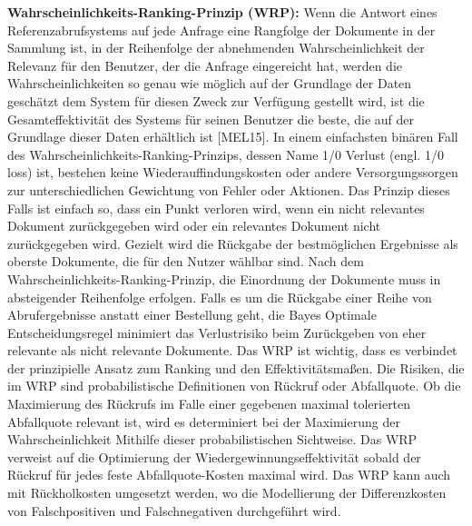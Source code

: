 \begin{itemize}
\textbf{Wahrscheinlichkeits-Ranking-Prinzip (WRP):} Wenn die Antwort eines Referenzabrufsystems auf jede Anfrage eine Rangfolge der Dokumente in der Sammlung ist, in der Reihenfolge der abnehmenden Wahrscheinlichkeit der Relevanz für den Benutzer, der die Anfrage eingereicht hat, werden die Wahrscheinlichkeiten so genau wie möglich auf der Grundlage der Daten geschätzt dem System für diesen Zweck zur Verfügung gestellt wird, ist die Gesamteffektivität des Systems für seinen Benutzer die beste, die auf der Grundlage dieser Daten erhältlich ist [MEL15]. In einem einfachsten binären Fall des Wahrscheinlichkeits-Ranking-Prinzips, dessen Name 1/0 Verlust (engl. 1/0 loss) ist, bestehen keine Wiederauffindungskosten oder andere Versorgungssorgen zur unterschiedlichen Gewichtung von Fehler oder Aktionen. Das Prinzip dieses Falls ist einfach so, dass ein Punkt verloren wird, wenn ein nicht relevantes Dokument zurückgegeben wird oder ein relevantes Dokument nicht zurückgegeben wird. Gezielt wird die Rückgabe der bestmöglichen Ergebnisse als oberste Dokumente, die für den Nutzer wählbar sind. Nach dem Wahrscheinlichkeits-Ranking-Prinzip, die Einordnung der Dokumente muss in absteigender Reihenfolge erfolgen. Falls es um die Rückgabe einer Reihe von Abrufergebnisse anstatt einer Bestellung geht, die Bayes Optimale Entscheidungsregel minimiert das Verlustrisiko beim Zurückgeben von eher relevante als nicht relevante Dokumente. Das WRP ist wichtig, dass es verbindet der prinzipielle Ansatz zum Ranking und den Effektivitätsmaßen. Die Risiken, die im WRP sind probabilistische Definitionen von Rückruf oder Abfallquote. Ob die Maximierung des Rückrufs im Falle einer gegebenen maximal tolerierten Abfallquote relevant ist, wird es determiniert bei der Maximierung der Wahrscheinlichkeit Mithilfe dieser probabilistischen Sichtweise. Das WRP verweist auf die Optimierung der Wiedergewinnungseffektivität sobald der Rückruf für jedes feste Abfallquote-Kosten maximal wird. Das WRP kann auch mit Rückholkosten umgesetzt werden, wo die Modellierung der Differenzkosten von Falschpositiven und Falschnegativen durchgeführt wird.


\end{itemize}
